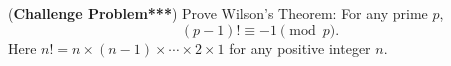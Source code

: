 (\textbf{Challenge Problem***}) Prove Wilson's Theorem: For any prime $p$,
\[(p - 1)! \equiv -1 \pmod{p}.\] Here $n! = n \times (n-1) \times \cdots \times 2 \times 1$ for any positive integer $n$.